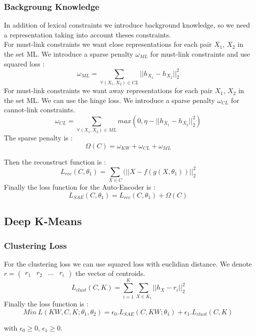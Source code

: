 \subsubsection{Backgroung Knowledge}
In addition of lexical constraints we introduce background knowledge, so we need
a representation taking into account theses constraints.\\
For must-link constraints we want close representations for each pair $X_1$, $X_2$
in the set ML. We introduce a sparse penalty $\omega_{ML}$ for must-link
constraints and use squared loss :
\begin{equation}\label{eq:omegaML}
  \omega_{ML} = \sum_{\forall{(X_1,X_2)\in CL}} || h_{X_1} - h_{X_2} ||_2^2
\end{equation}
For must-link constraints we want away representations for each pair $X_1$, $X_2$
in the set ML.
We can use the hinge loss.
We introduce a sparse penalty $\omega_{CL}$ for cannot-link constraints.
\begin{equation}\label{eq:omegaCL}
  \omega_{CL} = \sum_{\forall{(X_1,X_2)\in ML}} max(0,
  \eta - || h_{X_1} - h_{X_2} ||_2^2)
\end{equation}
The sparse penalty is :
\begin{equation}\label{eq:Sparse}
  \Omega(C) = \omega_{KW} + \omega_{CL} + \omega_{ML}  
\end{equation}

Then the reconstruct function is :
\begin{equation}\label{eq:AEDK}
  L_{rec}(C, \theta_1) = \sum_{X \in C}(||X - f(g(X, \theta_1))||_2^2
\end{equation}
Finally the loss function for the Auto-Encoder is :
\begin{equation}\label{eq:AE}
  L_{SAE}(C, \theta_1) = L_{rec}(C, \theta_1) + \Omega(C)  
\end{equation}

\subsection{Deep K-Means}

\subsubsection{Clustering Loss}

For the clustering loss we can use squared loss with euclidian distance. We
denote $r = \begin{pmatrix} r_1 & r_2 & ... & r_i\end{pmatrix}$ the vector of
centroids.  
\begin{equation}\label{eq:loss_clust}
  L_{clust}(C,K) = \sum_{i=1}^K \sum_{X \in K_i} ||h_X - r_i ||_2^2 
\end{equation}
Finally the loss function is :
\begin{equation}\label{eq:loss_FINALE}
  Min~L(KW, C, K; \theta_1, \theta_2) = \epsilon_0.L_{SAE}(C, KW; \theta_1) 
  + \epsilon_1.L_{clust}(C,K)
\end{equation}

with $\epsilon_0 \geq 0$, $\epsilon_1 \geq 0$.

